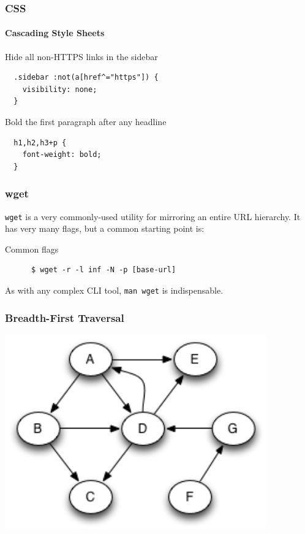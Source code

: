 \documentclass[dvipsnames]{beamer}
\begin{document}
\begin{frame}[fragile=singleslide]
  \frametitle{CSS}
  \framesubtitle{Cascading Style Sheets}
 
  \begin{block}{Hide all non-HTTPS links in the sidebar}
    \begin{Verbatim}
  .sidebar :not(a[href^="https"]) {
    visibility: none;
  }
    \end{Verbatim}
  \end{block} 

  \begin{block}{Bold the first paragraph after any headline}
    \begin{Verbatim}
  h1,h2,h3+p {
    font-weight: bold;
  }
    \end{Verbatim}
  \end{block}
\end{frame}


\begin{frame}[fragile=singleslide]
  \frametitle{wget}

  \texttt{wget} is a very commonly-used utility for mirroring an entire URL hierarchy.
  It has very many flags, but a common starting point is:

  \bigskip

  \begin{block}{Common flags}
    \begin{Verbatim}
      $ wget -r -l inf -N -p [base-url]
    \end{Verbatim}
  \end{block}

  \bigskip

  As with any complex CLI tool, \texttt{man wget} is indispensable.
\end{frame}


\begin{frame}
  \frametitle{Breadth-First Traversal}
  \includegraphics[width=320pt]{img/directed-cyclic-graph.png}
\end{frame}
\end{document}
